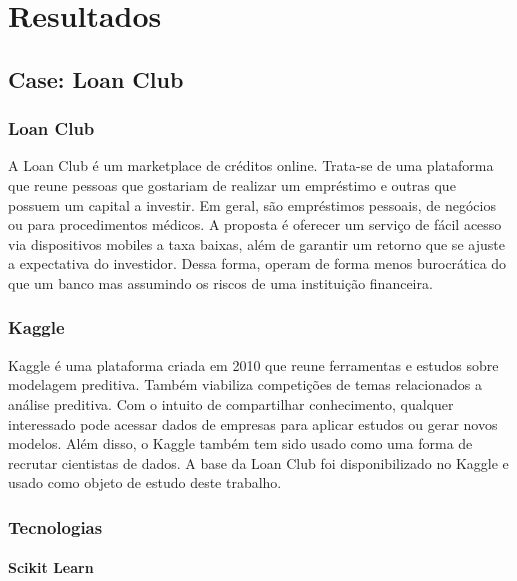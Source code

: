 \part{Resultados}

\chapter{Case: Loan Club}

\section{Loan Club}

A Loan Club é um marketplace de créditos online. Trata-se de uma plataforma que reune pessoas que gostariam de realizar um empréstimo e outras que possuem um capital a investir. Em geral, são empréstimos pessoais, de negócios ou para procedimentos médicos. A proposta é oferecer um serviço de fácil acesso via dispositivos mobiles a taxa baixas, além de garantir um retorno que se ajuste a expectativa do investidor. Dessa forma, operam de forma menos burocrática do que um banco mas assumindo os riscos de uma instituição financeira.

\section{Kaggle}

Kaggle é uma plataforma criada em 2010 que reune ferramentas e estudos sobre modelagem preditiva. Também viabiliza competições de temas relacionados a análise preditiva. Com o intuito de compartilhar conhecimento, qualquer interessado pode acessar dados de empresas para aplicar estudos ou gerar novos modelos. Além disso, o Kaggle também tem sido usado como uma forma de recrutar cientistas de dados. A base da Loan Club foi disponibilizado no Kaggle e usado como objeto de estudo deste trabalho.

\section{Tecnologias}

\subsection{Scikit Learn}

